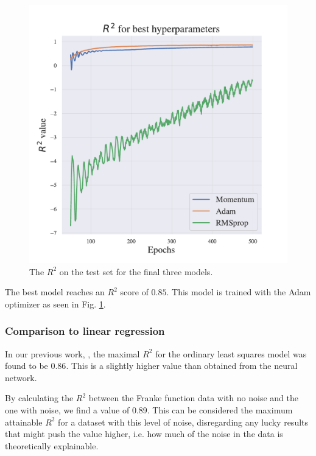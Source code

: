 \begin{figure}[h!]
    \centering
    \includegraphics[width=1.0\linewidth]{project_2/figures/best_continuous.pdf}
    \caption{The $R^2$ on the test set for the final three models.}
    \label{fig:best_franke}
\end{figure}

The best model reaches an $R^2$ score of $0.85$. This model is trained with the Adam optimizer as seen in Fig. \ref{fig:best_franke}.

\subsubsection{Comparison to linear regression}


In our previous work, \textcite{project1}, the maximal $R^2$ for the ordinary least squares model was found to be $0.86$. 
This is a slightly higher value than obtained from the neural network. 

By calculating the $R^2$ between the Franke function data with no noise and the one with noise, we find a value of 0.89. 
This can be considered the maximum attainable $R^2$ for a dataset with this level of noise, disregarding any lucky results that might push the value higher, i.e. how much of the noise in the data is theoretically explainable.


